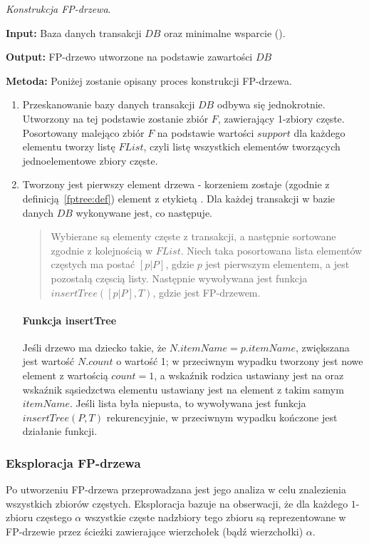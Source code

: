 \begin{alg}\label{alg:fptre:econstruction}
	\emph{Konstrukcja FP-drzewa}.

	\textbf{Input:} Baza danych transakcji $DB$ oraz minimalne wsparcie ().

	\textbf{Output:} FP-drzewo utworzone na podstawie zawartości $DB$

	\textbf{Metoda:} Poniżej zostanie opisany proces konstrukcji FP-drzewa.

	\begin{enumerate}
		\item Przeskanowanie bazy danych transakcji $DB$ odbywa się jednokrotnie. Utworzony na tej podstawie zostanie zbiór $F$, zawierający 1-zbiory częste. Posortowany malejąco zbiór $F$ na podstawie wartości $support$ dla każdego elementu tworzy listę $FList$, czyli listę wszystkich elementów tworzących jednoelementowe zbiory częste.
		\item Tworzony jest pierwszy element drzewa - korzeniem zostaje (zgodnie z definicją~\ref{fptree:def}) element z etykietą . Dla każdej transakcji w bazie danych $DB$ wykonywane jest, co następuje.
		\begin{quote}
			Wybierane są elementy częste z transakcji, a następnie sortowane zgodnie z kolejnością w $FList$. Niech taka posortowana lista elementów częstych ma postać $[p|P]$, gdzie $p$ jest pierwszym elementem, a  jest pozostałą częscią listy. Następnie wywoływana jest funkcja $insertTree([p|P], T)$, gdzie  jest FP-drzewem.
		\end{quote}
			\paragraph{Funkcja insertTree} Jeśli drzewo  ma dziecko  takie, że $N.itemName = p.itemName$, zwiększana jest wartość $N.count$ o wartość 1; w przeciwnym wypadku tworzony jest nowe element  z wartością $count = 1$, a wskaźnik rodzica ustawiany jest na  oraz wskaźnik sąsiedzctwa elementu ustawiany jest na element z takim samym $itemName$. Jeśli lista  była niepusta, to wywoływana jest funkcja $insertTree(P, T)$ rekurencyjnie, w przeciwnym wypadku kończone jest działanie funkcji.
	\end{enumerate}
\end{alg}

\subsubsection{Eksploracja FP-drzewa}
Po utworzeniu FP-drzewa przeprowadzana jest jego analiza w celu znalezienia wszystkich zbiorów częstych. Eksploracja bazuje na obserwacji, że dla każdego $1$-zbioru częstego $\alpha$ wszystkie częste nadzbiory tego zbioru są reprezentowane w FP-drzewie przez ścieżki zawierające wierzchołek (bądź wierzchołki) $\alpha$.


